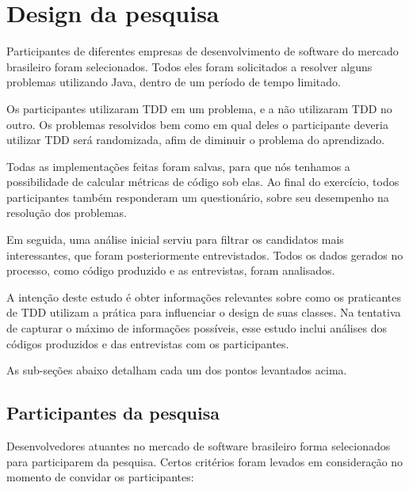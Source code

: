 \section{Design da pesquisa}

Participantes de diferentes empresas de desenvolvimento de software do mercado
brasileiro foram selecionados. Todos eles foram solicitados a resolver 
alguns problemas utilizando Java, dentro de um período de tempo limitado. 

Os participantes utilizaram TDD em um problema, e a não utilizaram
TDD no outro. Os problemas resolvidos bem como em qual deles o participante
deveria utilizar TDD será randomizada, afim de diminuir o problema do aprendizado.

Todas as implementações feitas foram salvas, para que nós tenhamos a possibilidade
de calcular métricas de código sob elas. Ao final do exercício, todos participantes
também responderam um questionário, sobre seu desempenho na resolução dos problemas.

Em seguida, uma análise inicial serviu para filtrar os candidatos
mais interessantes, que foram posteriormente entrevistados. 
Todos os dados gerados no processo, 
como código produzido e as entrevistas, foram analisados.

A intenção deste estudo é obter informações relevantes sobre como os
praticantes de TDD utilizam a prática para influenciar o design de suas
classes. Na tentativa de capturar o máximo de informações possíveis, esse estudo
inclui análises dos códigos produzidos e das entrevistas com os participantes.

As sub-seções abaixo detalham cada um dos pontos levantados acima.

\subsection{Participantes da pesquisa}
\label{sec:planejamento-participantes}

Desenvolvedores atuantes no mercado de 
software brasileiro forma selecionados para participarem da pesquisa.
Certos critérios foram levados em consideração no momento de convidar os participantes:

